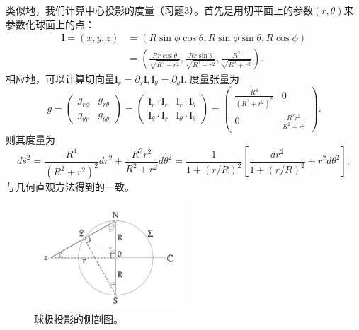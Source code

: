 \documentclass{article}
\begin{document}
类似地，我们计算中心投影的度量（习题3）。首先是用切平面上的参数$(r, \theta)$来参数化球面上的点：
\begin{equation*}
\begin{aligned}
\mathbf{l}=(x, y, z)
&=(R\sin\phi\cos\theta, R\sin\phi\sin\theta, R\cos\phi) \\
&=\left(\frac{Rr\cos\theta}{\sqrt{R^{2}+r^{2}}}, \frac{Rr\sin\theta}{\sqrt{R^{2}+r^{2}}}, \frac{R^{2}}{\sqrt{R^{2}+r^{2}}}\right).
\end{aligned}
\end{equation*}
相应地，可以计算切向量$\mathbf{l}_{r}=\partial_{r}\mathbf{l}, \mathbf{l}_\theta=\partial_{\theta}\mathbf{l}$.
度量张量为
\begin{equation}
g=\begin{pmatrix}
g_{r\phi} & g_{r\theta} \\
g_{\theta{r}} & g_{\theta\theta}
\end{pmatrix}
=\begin{pmatrix}
\mathbf{l}_{r}\cdot\mathbf{l}_{r} & \mathbf{l}_{r}\cdot\mathbf{l}_{\theta} \\
\mathbf{l}_{\theta}\cdot\mathbf{l}_{r} & \mathbf{l}_{\theta}\cdot\mathbf{l}_{\theta}
\end{pmatrix}
=\begin{pmatrix}
\frac{R^{4}}{\left(R^{2} + r^{2}\right)^{2}} & 0 \\
0 & \frac{R^{2}r^{2}}{R^{2} + r^{2}}
\end{pmatrix}.
\end{equation}
则其度量为
\begin{equation}
d\hat{s}^{2}=\frac{R^{4}}{\left(R^{2}+r^{2}\right)^{2}}dr^{2}+\frac{R^{2}r^{2}}{R^{2}+r^{2}}d\theta^{2}
=\frac{1}{1+(r/R)^{2}}\left[\frac{dr^{2}}{1+(r/R)^{2}}+r^{2}d\theta^{2}\right],
\end{equation}
与几何直观方法得到的一致。

\begin{figure}[htbp]
    \centering %
    \includegraphics[width=0.5\textwidth]{../figs/chap4_02.png}
    \caption{球极投影的侧剖图。} 
    \label{fig:chap4_02} 
\end{figure}
\end{document}
